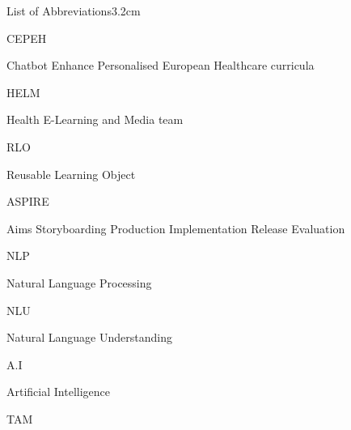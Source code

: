 \documentclass[a4paper, nobind]{templates/ociamthesis}
\begin{document}
\begin{romanpages}
\dominitoc %

\flushbottom

\tableofcontents

\listoffigures
	\mtcaddchapter

\listoftables
  \mtcaddchapter
\begin{mclistof}{List of Abbreviations}{3.2cm}

\item[CEPEH]

Chatbot Enhance Personalised European Healthcare curricula

\item[HELM]

Health E-Learning and Media team

\item[RLO]

Reusable Learning Object

\item[ASPIRE]

Aims Storyboarding Production Implementation Release Evaluation

\item[NLP]

Natural Language Processing

\item[NLU]

Natural Language Understanding

\item[A.I]

Artificial Intelligence

\item[TAM]


\end{mclistof}
\end{romanpages}
\end{document}
